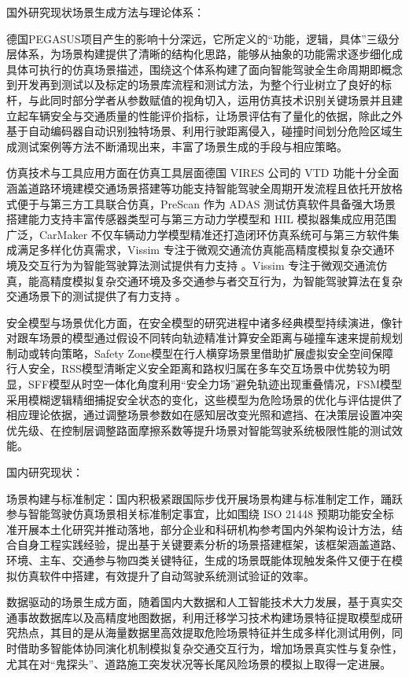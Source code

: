 国外研究现状场景生成方法与理论体系：

德国PEGASUS项目产生的影响十分深远，它所定义的“功能，逻辑，具体”三级分层体系，为场景构建提供了清晰的结构化思路，能够从抽象的功能需求逐步细化成具体可执行的仿真场景描述，围绕这个体系构建了面向智能驾驶全生命周期即概念到开发再到测试以及标定的场景库流程和测试方法，为整个行业树立了良好的标杆\cite{杨敏明2017基于自然驾驶实验的驾驶行为研究}，与此同时部分学者从参数赋值的视角切入，运用仿真技术识别关键场景并且建立起车辆安全与交通质量的性能评价指标，让场景评估有了量化的依据，除此之外基于自动编码器自动识别独特场景、利用行驶距离侵入，碰撞时间划分危险区域生成测试案例等方法不断涌现出来，丰富了场景生成的手段与相应策略。

仿真技术与工具应用方面在仿真工具层面德国 VIRES 公司的 VTD 功能十分全面涵盖道路环境建模交通场景搭建等功能支持智能驾驶全周期开发流程且依托开放格式便于与第三方工具联合仿真，PreScan 作为 ADAS 测试仿真软件具备强大场景搭建能力支持丰富传感器类型可与第三方动力学模型和 HIL 模拟器集成应用范围广泛，CarMaker 不仅车辆动力学模型精准还打造闭环仿真系统可与第三方软件集成满足多样化仿真需求，Vissim 专注于微观交通流仿真能高精度模拟复杂交通环境及交互行为为智能驾驶算法测试提供有力支持 。Vissim 专注于微观交通流仿真，能高精度模拟复杂交通环境及多交通参与者交互行为，为智能驾驶算法在复杂交通场景下的测试提供了有力支持 。

安全模型与场景优化方面，在安全模型的研究进程中诸多经典模型持续演进，像针对跟车场景的模型通过假设不同转向轨迹精准计算安全距离与碰撞车速来提前规划制动或转向策略，Safety Zone模型在行人横穿场景里借助扩展虚拟安全空间保障行人安全，RSS模型清晰定义安全距离和路权归属在多车交互场景中优势较为明显，SFF模型从时空一体化角度利用“安全力场”避免轨迹出现重叠情况，FSM模型采用模糊逻辑精细捕捉安全状态的变化，这些模型为危险场景的优化与评估提供了相应理论依据，通过调整场景参数如在感知层改变光照和遮挡、在决策层设置冲突优先级、在控制层调整路面摩擦系数等提升场景对智能驾驶系统极限性能的测试效能。

国内研究现状：

场景构建与标准制定：国内积极紧跟国际步伐开展场景构建与标准制定工作，踊跃参与智能驾驶仿真场景相关标准制定事宜，比如围绕 ISO 21448 预期功能安全标准开展本土化研究并推动落地，部分企业和科研机构参考国内外架构设计方法，结合自身工程实践经验，提出基于关键要素分析的场景搭建框架，该框架涵盖道路、环境、主车、交通参与物四类关键特征，生成的场景既能体现触发条件又便于在模拟仿真软件中搭建，有效提升了自动驾驶系统测试验证的效率\cite{neale2002100}。

数据驱动的场景生成方面，随着国内大数据和人工智能技术大力发展，基于真实交通事故数据库以及高精度地图数据，利用迁移学习技术构建场景特征提取模型成研究热点，其目的是从海量数据里高效提取危险场景特征并生成多样化测试用例，同时借助多智能体协同演化机制模拟复杂交通交互行为，增加场景真实性与复杂性，尤其在对“鬼探头”、道路施工突发状况等长尾风险场景的模拟上取得一定进展。


